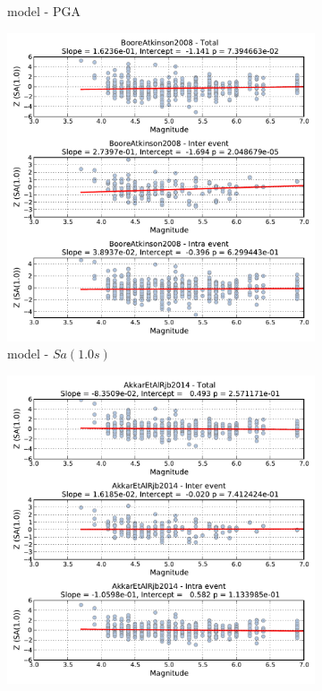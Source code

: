 \begin{figure}[htb]
\begin{subfigure}[b]{0.49\textwidth}
      \caption{\cite{Akkar_etal2014} model - PGA}
      \label{fig:pga_mag_akkar2014}
  \end{subfigure}
    \begin{subfigure}[b]{0.49\textwidth}
      \includegraphics[width=\textwidth]{./figures/residuals/BA2008_Magnitude_Sa1.pdf}
      \caption{\cite{boore2008} model - $Sa \left( {1.0 s} \right)$}
      \label{fig:sa1_mag_ba2008}
  \end{subfigure}
      \begin{subfigure}[b]{0.49\textwidth}
      \includegraphics[width=\textwidth]{./figures/residuals/Akkar2014_Magnitude_Sa1.pdf}

\end{subfigure}
\end{figure}
